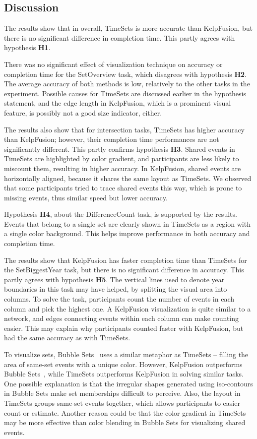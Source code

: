 \subsection{Discussion}
The results show that in overall, TimeSets is more accurate than KelpFusion, but there is no significant difference in completion time. This partly agrees with hypothesis \textbf{H1}.

There was no significant effect of visualization technique on accuracy or completion time for the SetOverview task, which disagrees with hypothesis \textbf{H2}. The average accuracy of both methods is low, relatively to the other tasks in the experiment. Possible causes for TimeSets are discussed earlier in the hypothesis statement, and the edge length in KelpFusion, which is a prominent visual feature, is possibly not a good size indicator, either.

The results also show that for intersection tasks, TimeSets has higher accuracy than KelpFusion; however, their completion time performances are not significantly different. This partly confirms hypothesis \textbf{H3}. Shared events in TimeSets are highlighted by color gradient, and participants are less likely to miscount them, resulting in higher accuracy. In KelpFusion, shared events are horizontally aligned, because it shares the same layout as TimeSets. We observed that some participants tried to trace shared events this way, which is prone to missing events, thus similar speed but lower accuracy.

Hypothesis \textbf{H4}, about the DifferenceCount task, is supported by the results. Events that belong to a single set are clearly shown in TimeSets as a region with a single color background. This helps improve performance in both accuracy and completion time.

The results show that KelpFusion has faster completion time than TimeSets for the SetBiggestYear task, but there is no significant difference in accuracy. This partly agrees with hypothesis \textbf{H5}. The vertical lines used to denote year boundaries in this task may have helped, by splitting the visual area into columns. To solve the task, participants count the number of events in each column and pick the highest one. A KelpFusion visualization is quite similar to a network, and edges connecting events within each column can make counting easier. This may explain why participants counted faster with KelpFusion, but had the same accuracy as with TimeSets.

To visualize sets, Bubble Sets~\cite{Collins2009a} uses a similar metaphor as TimeSets -- filling the area of same-set events with a unique color. However, KelpFusion outperforms Bubble Sets~\cite{Meulemans2013}, while TimeSets outperforms KelpFusion in solving similar tasks. One possible explanation is that the irregular shapes generated using iso-contours in Bubble Sets make set memberships difficult to perceive. Also, the layout in TimeSets groups same-set events together, which allows participants to easier count or estimate. Another reason could be that the color gradient in TimeSets may be more effective than color blending in Bubble Sets for visualizing shared events.

